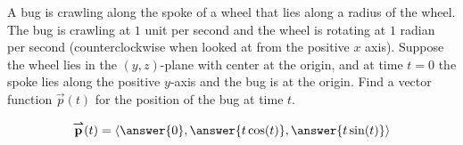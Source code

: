 \documentclass{ximera}
\author{David Guichard \and Neal Koblitz \and H. Jerome Keisler \and Albert Scheller \and Barry Balof \and Mike Wills \and Matthew Carr}
\begin{document}
\begin{exercise}
A bug is crawling along the spoke of a wheel that lies along a radius
of the wheel. The bug is crawling at $1$ unit per second and the wheel
is rotating at $1$ radian per second (counterclockwise when looked at
from the positive $x$ axis). Suppose the wheel lies in the
$(y,z)$-plane with center at the origin, and at time $t = 0$ the spoke
lies along the positive $y$-axis and the bug is at the origin. Find a
vector function $\vec{p}(t)$ for the position of the bug at time $t$.
\begin{prompt}
\[
\vec{p}(t)=\vector{\answer{0},\answer{t\cos(t)},\answer{t\sin(t)}}
\]
\end{prompt}

\end{exercise}
\end{document}
